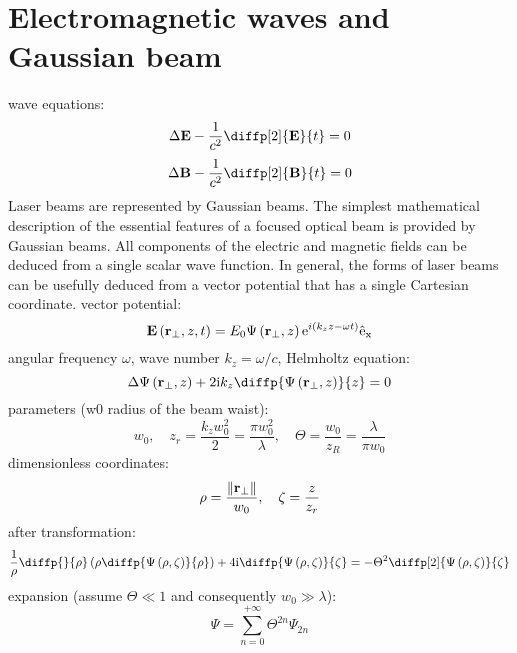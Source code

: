 \section{Electromagnetic waves and Gaussian beam}
wave equations:
\begin{equation}
\laplace{\vec{E}} - \frac{1}{c^{2}} \diffp[2]{\vec{E}}{t} = 0
\end{equation}
\begin{equation}
\laplace{\vec{B}} - \frac{1}{c^{2}} \diffp[2]{\vec{B}}{t} = 0
\end{equation}
Laser beams are represented by Gaussian beams.
The simplest mathematical description of the essential features of a focused optical beam is provided by Gaussian beams.
All components of the electric and magnetic fields can be deduced from a single scalar wave function.
In general, the forms of laser beams can be usefully deduced from a vector potential that has a single Cartesian coordinate.
vector potential:
\begin{equation}
\mathbf{E}\left(\mathbf{r_\bot}, z, t \right)  = E_0 \Psi \left(\mathbf{r_\bot}, z \right) \mathrm{e}^{i \left(k_z z - \omega t \right)} \mathrm{\hat{e}_x}
\end{equation}
angular frequency $ \omega $, wave number $ k_z = \omega/c $, 
Helmholtz equation:
\begin{equation}
\laplace{\Psi \left(\vec{r_\bot}, z \right)} + 2 \i k_z \diffp{\Psi \left(\vec{r_\bot}, z \right)}{z} = 0
\end{equation}
parameters (w0 radius of the beam waist):
\begin{equation}
w_0, \quad z_r = \frac{k_z w_0^2}{2} = \frac{\pi w_0^2}{\lambda}, \quad \Theta = \frac{w_0}{z_R} = \frac{\lambda}{\pi w_0}
\end{equation}
dimensionless coordinates:
\begin{equation}
\rho = \frac{\lVert\mathbf{r_\bot}\rVert}{w_0}, \quad \zeta = \frac{z}{z_r}
\end{equation}
after transformation:
\begin{equation}
\frac{1}{\rho} \diffp{}{\rho}\left(\rho \diffp{\Psi \left(\rho, \zeta \right)}{\rho} \right) + 4 \i \diffp{\Psi \left(\rho, \zeta \right)}{\zeta}  = - \Theta^2 \diffp[2]{\Psi \left(\rho, \zeta \right)}{\zeta}
\end{equation}
expansion (assume $ \Theta \ll 1 $ and consequently $  w_0 \gg \lambda $):
\begin{equation}
\Psi = \sum_{n = 0}^{+\infty} \Theta^{2n} \Psi_{2n}
\end{equation}
